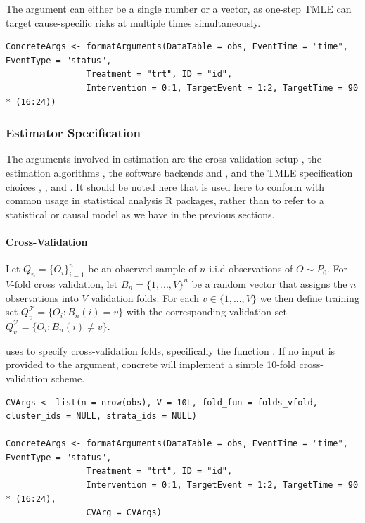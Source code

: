 \documentclass{report}
\newcommand{\1}{\ensuremath{\mathbf{1}}}
\begin{document}
The  argument can either be a single number or a vector, as one-step TMLE can target cause-specific risks at multiple times simultaneously.

\begin{lstlisting}
ConcreteArgs <- formatArguments(DataTable = obs, EventTime = "time", EventType = "status", 
				Treatment = "trt", ID = "id", 
				Intervention = 0:1, TargetEvent = 1:2, TargetTime = 90 * (16:24))
\end{lstlisting}

\subsubsection{Estimator Specification}
\label{EstimationSpec}
The arguments involved in estimation are the cross-validation setup , the estimation algorithms , the software backends  and , and the TMLE specification choices , , and . It should be noted here that  is used here to conform with common usage in statistical analysis R packages, rather than to refer to a statistical or causal model as we have in the previous sections. 

\paragraph{Cross-Validation}
\label{CV}
Let \(Q_n = \{O_i\}_{i=1}^n\) be an observed sample of \(n\) i.i.d observations of \(O \sim P_0\). For \(V\text{-fold}\) cross validation, let \(B_n = \{1, ... , V\}^n\) be a random vector that assigns the \(n\) observations into \(V\) validation folds. For each \(v \in \{1, ..., V\}\) we then define training set \(Q^\mathcal{T}_v = \{O_i : B_n(i) = v\}\) with the corresponding validation set \(Q^\mathcal{V}_v = \{O_i : B_n(i) \neq v\}\).

 uses  to specify cross-validation folds, specifically the function
. If no input is provided to the  argument, concrete will implement a simple 10-fold cross-validation scheme.

\begin{lstlisting}
CVArgs <- list(n = nrow(obs), V = 10L, fold_fun = folds_vfold, cluster_ids = NULL, strata_ids = NULL)

ConcreteArgs <- formatArguments(DataTable = obs, EventTime = "time", EventType = "status", 
				Treatment = "trt", ID = "id", 
				Intervention = 0:1, TargetEvent = 1:2, TargetTime = 90 * (16:24), 
				CVArg = CVArgs)
\end{lstlisting}
\end{document}
